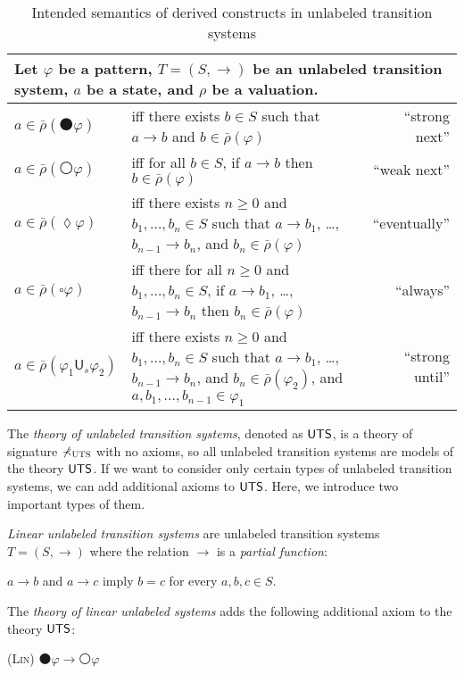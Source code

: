 \documentclass[acmsmall]{acmart}
\newcommand{\barrho}{\bar{\rho}}
\newcommand{\wnext}{{\medcirc}}
\newcommand{\snext}{{\medbullet}}
\newcommand{\always}{{\square}}
\newcommand{\eventually}{{\lozenge}}
\newcommand{\Us}{\mathbin{\mathsf{U}_s}}
\newcommand{\sig}{\mathbb{\Sigma}}
\newcommand{\sigUTS}{{\sig_\textsc{UTS}}\xspace}
\newcommand{\MLUTS}{\textnormal{\textsf{UTS}}\xspace}
\newcommand{\ddd}{,\dots,}
\newcommand{\prule}[1]{\textnormal{(\textsc{#1})}}
\begin{document}
\begin{table}
\begin{tabular}{|lp{8cm}|r|}
\hline
\multicolumn{3}{|p{\textwidth}|}{
Let $\varphi$ be a pattern,
$T = (S,\to)$ be an unlabeled transition system,
$a$ be a state,
and
$\rho$ be a valuation.
}
\\\hline
$a \in \barrho(\snext \varphi)$ 
& iff
  there exists $b \in S$ such that
  $a \to b$ and $b \in \barrho(\varphi)$
& ``strong next'' \\
$a \in \barrho(\wnext \varphi)$ 
& iff for all $b \in S$,
      if $a \to b$ then $b \in \barrho(\varphi)$
& ``weak next'' \\
$a \in \barrho(\eventually \varphi)$ 
&iff there exists $n \ge 0$ and $b_1 \ddd b_n \in S$ such that
           $a \to b_1$, \dots, $b_{n-1} \to b_n$,
           and $b_n \in \barrho(\varphi)$
& ``eventually'' \\
$a \in \barrho(\always \varphi)$ 
&iff there for all $n \ge 0$ and $b_1 \ddd b_n \in S$,
     if $a \to b_1$, \dots, $b_{n-1} \to b_n$
     then $b_n \in \barrho(\varphi)$
& ``always'' \\
$a \in \barrho(\varphi_1 \Us \varphi_2)$ 
&iff there exists $n \ge 0$ and $b_1 \ddd b_n \in S$ such that
           $a \to b_1$, \dots, $b_{n-1} \to b_n$,
           and $b_n \in \barrho(\varphi_2)$,
           and $a, b_1 \ddd b_{n-1} \in \varphi_1$
& ``strong until'' \\
\hline
\end{tabular}
\caption{Intended semantics of derived constructs in unlabeled transition 
systems}
\label{tab_semantics_UTS}
\end{table}

The \emph{theory of unlabeled transition systems}, denoted as
$\MLUTS$, 
is a theory of signature $\sigUTS$ with no axioms,
so all unlabeled transition systems are models of the theory
$\MLUTS$.
If we want to consider only certain types of unlabeled
transition systems, we can add additional axioms to $\MLUTS$.
Here, we introduce two important types of them.

\emph{Linear unlabeled transition systems} are
unlabeled transition systems $T = (S, \to)$
where the relation $\to$ is a \emph{partial function}:
\begin{center}
$a \to b$ and $a \to c$ imply $b = c$
\qquad for every $a,b,c \in S$.
\end{center}
The \emph{theory of linear unlabeled systems}
adds the following additional axiom to the theory $\MLUTS$:
\begin{center}
\prule{Lin} \qquad
$\snext \varphi \to \wnext \varphi$
\end{center}
\end{document}
